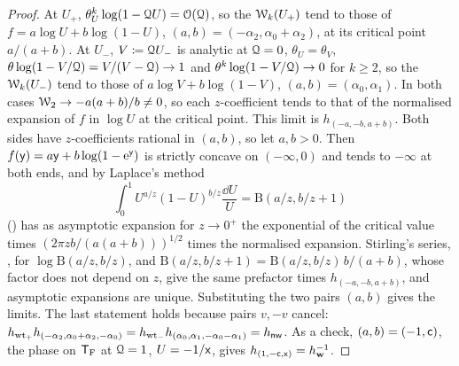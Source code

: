 \begin{proof}
At $U_+$, $\theta_U^k\log(1-\mathcal{Q} U)=\mathcal{O}(\mathcal{Q})$, so the $\mathcal{W}_k(U_+)$ tend to those of $f=a\log U+b\log(1-U)$, $(a,b)=(-\alpha_2,\alpha_0+\alpha_2)$, at its critical point $a/(a+b)$. At $U_-$, $V\coloneqq\mathcal{Q} U_-$ is analytic at $\mathcal{Q}=0$, $\theta_U=\theta_V$, $\theta\log(1-V/\mathcal{Q})=V/(V-\mathcal{Q})\to 1$ and $\theta^k\log(1-V/\mathcal{Q})\to 0$ for $k\geq 2$, so the $\mathcal{W}_k(U_-)$ tend to those of $a\log V+b\log(1-V)$, $(a,b)=(\alpha_0,\alpha_1)$. In both cases $\mathcal{W}_2\to-a(a+b)/b\neq 0$, so each $z$-coefficient tends to that of the normalised expansion of $f$ in $\log U$ at the critical point. This limit is $h_{(-a,-b,a+b)}$. Both sides have $z$-coefficients rational in $(a,b)$, so let $a,b>0$. Then $f(\mathsf{y})=a\mathsf{y}+b\log(1-\mathrm{e}^{\mathsf{y}})$ is strictly concave on $(-\infty,0)$ and tends to $-\infty$ at both ends, and by Laplace's method
\[
\int_0^1U^{a/z}(1-U)^{b/z}\frac{\dd U}{U}=\mathrm{B}(a/z,b/z+1)
\]
(\cite[5.12.1]{DLMF}) has as asymptotic expansion for $z\to 0^+$ the exponential of the critical value times $(2\pi zb/(a(a+b)))^{1/2}$ times the normalised expansion. Stirling's series, \cite[5.11.1, Section~5.11(ii)]{DLMF}, for $\log\mathrm{B}(a/z,b/z)$, and $\mathrm{B}(a/z,b/z+1)=\mathrm{B}(a/z,b/z)\,b/(a+b)$, whose factor does not depend on $z$, give the same prefactor times $h_{(-a,-b,a+b)}$, and asymptotic expansions are unique. Substituting the two pairs $(a,b)$ gives the limits. The last statement holds because pairs $v,-v$ cancel: $h_{\mathrm{wt}_+}h_{(-\alpha_2,\alpha_0+\alpha_2,-\alpha_0)}=h_{\mathrm{wt}_-}h_{(\alpha_0,\alpha_1,-\alpha_0-\alpha_1)}=h_{\mathsf{nw}}$. As a check, $(a,b)=(-1,\mathsf{c})$, the phase on $\mathsf{T}_{\mathrm{F}}$ at $\mathcal{Q}=1$, $U=-1/\mathsf{x}$, gives $h_{(1,-\mathsf{c},\mathsf{x})}=h_{\mathbf{w}}^{-1}$.
\end{proof}

